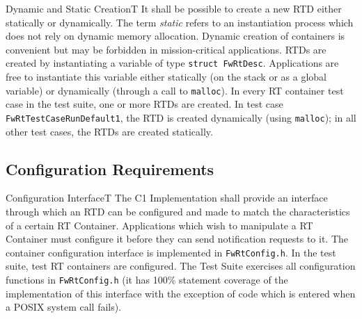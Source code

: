 \documentclass[requirements]{../fwprofile}
\begin{document}
\begin{fw_req_note}{Dynamic and Static Creation}{T}
{ It shall be possible to create a new RTD either statically or dynamically.}
{The term \emph{static} refers to an instantiation process which does not rely on dynamic memory allocation.}
{Dynamic creation of containers is convenient but may be forbidden in mission-critical applications.}
{RTDs are created by instantiating a variable of type \texttt{struct FwRtDesc}. Applications are free to instantiate this variable either statically (on the stack or as a global variable) or dynamically (through a call to \texttt{malloc}). } 
{In every RT container test case in the test suite, one or more RTDs are created. In test case \texttt{FwRtTestCaseRunDefault1}, the RTD is created dynamically (using \texttt{malloc}); in all other test cases, the RTDs are created statically.}
\end{fw_req_note}


\subsection{Configuration Requirements}\label{req:configInterfaceRTD}

\begin{fw_req}{Configuration Interface}{T}
{The C1 Implementation shall provide an interface through which an RTD can be configured and made to match the characteristics of a certain RT Container.}
{Applications which wish to manipulate a RT Container must configure it before they can send notification requests to it.}
{The container configuration interface is implemented in \texttt{FwRtConfig.h}.} 
{In the test suite, test RT containers are configured. The Test Suite exercises all configuration functions in \texttt{FwRtConfig.h} (it has 100\% statement coverage of the implementation of this interface with the exception of code which is entered when a POSIX system call fails).}
\end{fw_req}
\end{document}
